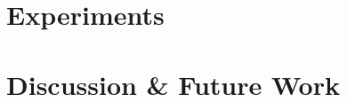 \documentclass{article}
\newif\ifsup\supfalse
\theoremstyle{plain}
\theoremstyle{definition}
\begin{document}
\section{Experiments}
\label{sec:experiments}




\section{Discussion \& Future Work}
\label{sec:discussion}


{\small}


\ifsup
\section{Additional Experiments}

\section{Proofs}

\fi
\end{document}
